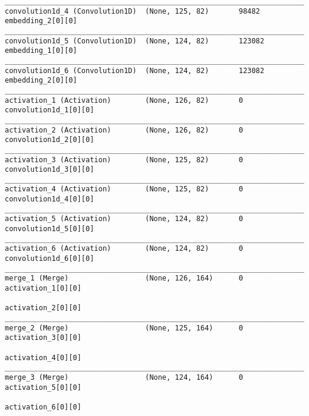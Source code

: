 \begin{lstlisting}[basicstyle=\tiny,frame=single]
____________________________________________________________________________________________________  
convolution1d_4 (Convolution1D)  (None, 125, 82)       98482       embedding_2[0][0]                  
____________________________________________________________________________________________________  
convolution1d_5 (Convolution1D)  (None, 124, 82)       123082      embedding_1[0][0]                  
____________________________________________________________________________________________________  
convolution1d_6 (Convolution1D)  (None, 124, 82)       123082      embedding_2[0][0]                  
____________________________________________________________________________________________________  
activation_1 (Activation)        (None, 126, 82)       0           convolution1d_1[0][0]              
____________________________________________________________________________________________________  
activation_2 (Activation)        (None, 126, 82)       0           convolution1d_2[0][0]              
____________________________________________________________________________________________________  
activation_3 (Activation)        (None, 125, 82)       0           convolution1d_3[0][0]              
____________________________________________________________________________________________________  
activation_4 (Activation)        (None, 125, 82)       0           convolution1d_4[0][0]              
____________________________________________________________________________________________________  
activation_5 (Activation)        (None, 124, 82)       0           convolution1d_5[0][0]              
____________________________________________________________________________________________________  
activation_6 (Activation)        (None, 124, 82)       0           convolution1d_6[0][0]
____________________________________________________________________________________________________  
merge_1 (Merge)                  (None, 126, 164)      0           activation_1[0][0]
                                                                   activation_2[0][0]
____________________________________________________________________________________________________
merge_2 (Merge)                  (None, 125, 164)      0           activation_3[0][0]
                                                                   activation_4[0][0]
____________________________________________________________________________________________________
merge_3 (Merge)                  (None, 124, 164)      0           activation_5[0][0]
                                                                   activation_6[0][0]

\end{lstlisting}
